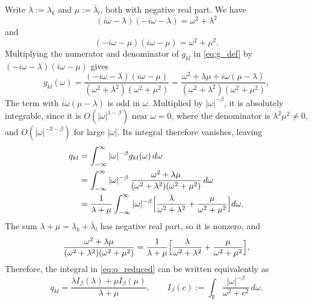 \documentclass[12pt]{article}
\begin{document}
Write $\lambda:=\lambda_k$ and $\mu:=\bar\lambda_l$, both with negative real part. We have
\begin{equation}
    (i\omega-\lambda)(-i\omega-\lambda)=\omega^2+\lambda^2
    \label{eq:lambda_denominator}
\end{equation}
and
\begin{equation}
    (-i\omega-\mu)(i\omega-\mu)=\omega^2+\mu^2.
    \label{eq:mu_denominator}
\end{equation}
Multiplying the numerator and denominator of $g_{kl}$ in \eqref{eq:g_def} by $(-i\omega-\lambda)(i\omega-\mu)$ gives
\begin{equation}
    g_{kl}(\omega)=\frac{(-i\omega-\lambda)(i\omega-\mu)}{(\omega^2+\lambda^2)(\omega^2+\mu^2)}
    =\frac{\omega^2+\lambda\mu+i\omega(\mu-\lambda)}{(\omega^2+\lambda^2)(\omega^2+\mu^2)},
    \label{eq:g_rational}
\end{equation}
The term with $i\omega(\mu-\lambda)$ is odd in $\omega$. Multiplied by $|\omega|^{-\beta}$, it is absolutely integrable, since it is
$O(|\omega|^{1-\beta})$ near $\omega=0$, where the denominator is $\lambda^2\mu^2\neq0$, and $O(|\omega|^{-3-\beta})$ for large
$|\omega|$. Its integral therefore vanishes, leaving
\begin{equation}
    \begin{aligned}
    q_{kl}
    &=\int_{-\infty}^{\infty}|\omega|^{-\beta}g_{kl}(\omega)\,d\omega\\
    &=\int_{-\infty}^{\infty}|\omega|^{-\beta}\,
    \frac{\omega^2+\lambda\mu}{(\omega^2+\lambda^2)(\omega^2+\mu^2)}\,d\omega\\
    &=\frac{1}{\lambda+\mu}\int_{-\infty}^{\infty}|\omega|^{-\beta}
    \Bigl[\frac{\lambda}{\omega^2+\lambda^2}+\frac{\mu}{\omega^2+\mu^2}\Bigr]d\omega.
    \end{aligned}
    \label{eq:q_reduced}
\end{equation}
The sum $\lambda+\mu=\lambda_k+\bar\lambda_l$ has negative real part, so it is nonzero, and
\begin{equation}
    \frac{\omega^2+\lambda\mu}{(\omega^2+\lambda^2)(\omega^2+\mu^2)}
    =\frac{1}{\lambda+\mu}\Bigl[\frac{\lambda}{\omega^2+\lambda^2}+\frac{\mu}{\omega^2+\mu^2}\Bigr],
    \label{eq:pf_general}
\end{equation}
Therefore, the integral in \eqref{eq:q_reduced} can be written equivalently as
\begin{equation}
    q_{kl}=\frac{\lambda I_\beta(\lambda)+\mu I_\beta(\mu)}{\lambda+\mu},
    \qquad
    I_\beta(c):=\int_{\mathbb R}\frac{|\omega|^{-\beta}}{\omega^2+c^2}\,d\omega.
    \label{eq:q_two_integrals}
\end{equation}
\end{document}
